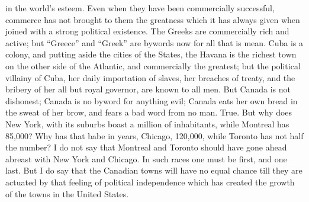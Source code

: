 in the world's esteem.  Even when they have been commercially
successful, commerce has not brought to them the greatness which it
has always given when joined with a strong political existence.
The Greeks are commercially rich and active; but ``Greece'' and
``Greek'' are bywords now for all that is mean.  Cuba is a colony,
and putting aside the cities of the States, the Havana is the
richest town on the other side of the Atlantic, and commercially
the greatest; but the political villainy of Cuba, her daily
importation of slaves, her breaches of treaty, and the bribery of
her all but royal governor, are known to all men.  But Canada is
not dishonest; Canada is no byword for anything evil; Canada eats
her own bread in the sweat of her brow, and fears a bad word from
no man.  True.  But why does New York, with its suburbs boast a
million of inhabitants, while Montreal has 85,000?  Why has that
babe in years, Chicago, 120,000, while Toronto has not half the
number?  I do not say that Montreal and Toronto should have gone
ahead abreast with New York and Chicago.  In such races one must be
first, and one last.  But I do say that the Canadian towns will
have no equal chance till they are actuated by that feeling of
political independence which has created the growth of the towns in
the United States.


